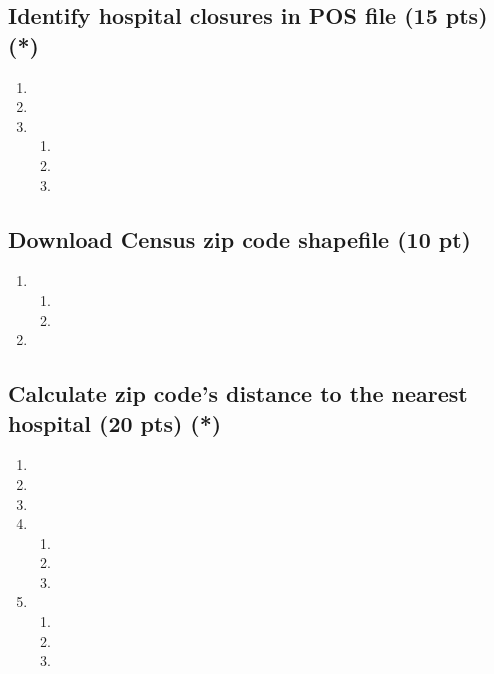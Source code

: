 \documentclass[
  letterpaper,
  DIV=11,
  numbers=noendperiod]{scrartcl}
\providecommand{\tightlist}{%
  \setlength{\itemsep}{0pt}\setlength{\parskip}{0pt}}\usepackage{longtable,booktabs,array}
\begin{document}
\subsection{Identify hospital closures in POS file (15 pts)
(*)}\label{identify-hospital-closures-in-pos-file-15-pts}

\begin{enumerate}
\def\labelenumi{\arabic{enumi}.}
\tightlist
\item
\item
\item
  \begin{enumerate}
  \def\labelenumii{\alph{enumii}.}
  \tightlist
  \item
  \item
  \item
  \end{enumerate}
\end{enumerate}

\subsection{Download Census zip code shapefile (10
pt)}\label{download-census-zip-code-shapefile-10-pt}

\begin{enumerate}
\def\labelenumi{\arabic{enumi}.}
\tightlist
\item
  \begin{enumerate}
  \def\labelenumii{\alph{enumii}.}
  \tightlist
  \item
  \item
  \end{enumerate}
\item
\end{enumerate}

\subsection{Calculate zip code's distance to the nearest hospital (20
pts)
(*)}\label{calculate-zip-codes-distance-to-the-nearest-hospital-20-pts}

\begin{enumerate}
\def\labelenumi{\arabic{enumi}.}
\tightlist
\item
\item
\item
\item
  \begin{enumerate}
  \def\labelenumii{\alph{enumii}.}
  \tightlist
  \item
  \item
  \item
  \end{enumerate}
\item
  \begin{enumerate}
  \def\labelenumii{\alph{enumii}.}
  \tightlist
  \item
  \item
  \item
  \end{enumerate}
\end{enumerate}
\end{document}
